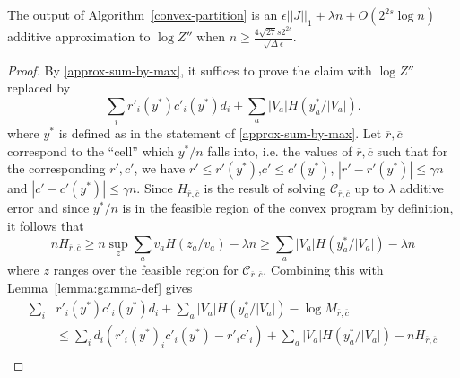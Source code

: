 \documentclass[final, 12pt]{colt2018}
\theoremstyle{definition}
\theoremstyle{plain}
\begin{document}
\begin{lemma}\label{convex-partition-correctness}
The output of Algorithm~\ref{convex-partition} is an $\epsilon ||J||_{1} + \lambda n + O(2^{2s}\log n)$
additive approximation to $\log Z''$ when $n \geq \frac{4\sqrt{27}s2^{2s}}{\sqrt{\Delta} \epsilon}$.
\end{lemma}
\begin{proof}
\begin{comment}
Recall that
\[ Z'' = \sum_{y} \exp\left(\sum_i r'(y)_i c'(y)_i d_i + \sum_a |V_a| H(y_a/V_a)\right) \]
Observe that if 
$y$ is an arbitrary term in the sum and $y^*$ corresponds
to the largest term in the sum,
we know that
\begin{align}
Z'' &\ge\exp\left(\sum_i r'(y)_i c'(y)_i d_i + \sum_a |V_a| H(y_a/V_a)\right), \label{z''-below} \\
Z'' &\le n^{2^{2s}} \exp\left(\sum_i r'(y^*)_i c'(y^*)_i d_i + \sum_a |V_a|, \label{z''-above} H(y^*_a/V_a)\right).
\end{align}
We will use these bounds to relate $Z''$ to the output $M$ of Algorithm~\ref{convex-partition}.
\end{comment}
By \cref{approx-sum-by-max}, it suffices to prove the claim with $\log{Z''}$ replaced by 
\[ \sum_{i}r'_i(y^{\ast})c'_i(y^{\ast})d_{i}+\sum_{a}|V_{a}|H(y_{a}^{\ast}/|V_{a}|). \]
where $y^{*}$ is defined as in the statement of \cref{approx-sum-by-max}.
Let $\overline{r},\overline{c}$ correspond to the ``cell'' which $y^*/n$ falls into,
i.e. the values of $\overline{r},\overline{c}$ such that for the corresponding
$r',c'$, we have $r' \le r'(y^*)$,$c' \le c'(y^*)$, $|r' - r'(y^*)| \le \gamma n$
and $|c' - c'(y^*)| \le \gamma n$. Since $H_{\overline{r},\overline{c}}$ 
is the result of solving $\mathcal{C}_{\overline{r},\overline{c}}$ up to $\lambda$
additive error and since $y^*/n$ is in the feasible region of the convex program by definition, it follows that
\[ n H_{\overline{r},\overline{c}} \ge n \sup_{z} \sum_a v_a H(z_a/v_a) - \lambda n \ge \sum_a |V_a| H(y^*_a/|V_a|) - \lambda n \]
where $z$ ranges over the feasible region for $\mathcal{C}_{\overline{r},\overline{c}}$.
Combining this with Lemma~\ref{lemma:gamma-def} gives 
\begin{align*}
\sum_i &r'_i(y^*) c'_i(y^*) d_i + \sum_a |V_a| H(y^*_a/|V_a|) - \log M_{\overline{r},\overline{c}} \\
&\le \sum_i d_i (r'_i(y^*)_i c'_i(y^*) - r'_i c'_i) + \sum_a |V_a| H(y^*_a/|V_a|) - n H_{\overline{r},\overline{c}} \\

\end{align*}
\end{proof}
\end{document}
